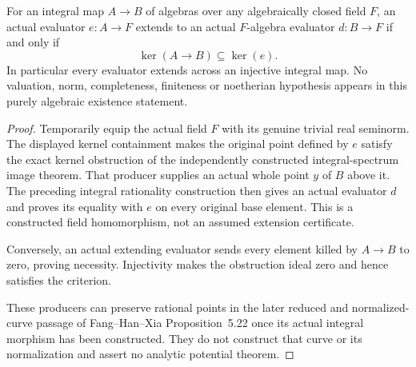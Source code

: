 \begin{theorem}
\label{spectrum:integral-rational-evaluator-existence}
\leanok
{}
For an integral map $A\to B$ of algebras over any algebraically closed
field $F$, an actual evaluator $e:A\to F$ extends to an actual
$F$-algebra evaluator $d:B\to F$ if and only if
\[
 \ker(A\to B)\subseteq\ker(e).
\]
In particular every evaluator extends across an injective integral map.
No valuation, norm, completeness, finiteness or noetherian hypothesis
appears in this purely algebraic existence statement.
\end{theorem}
\begin{proof}
Temporarily equip the actual field $F$ with its genuine trivial real
seminorm. The displayed kernel containment makes the original point
defined by $e$ satisfy the exact kernel obstruction of the independently
constructed integral-spectrum image theorem. That producer supplies an
actual whole point $y$ of $B$ above it. The preceding integral rationality
construction then gives an actual evaluator $d$ and proves its equality
with $e$ on every original base element. This is a constructed field
homomorphism, not an assumed extension certificate.

Conversely, an actual extending evaluator sends every element killed
by $A\to B$ to zero, proving necessity. Injectivity makes the obstruction
ideal zero and hence satisfies the criterion.

These producers can preserve rational points in the later reduced and
normalized-curve passage of Fang--Han--Xia Proposition~5.22 once its actual
integral morphism has been constructed. They do not construct that
curve or its normalization and assert no analytic potential theorem.
\end{proof}
